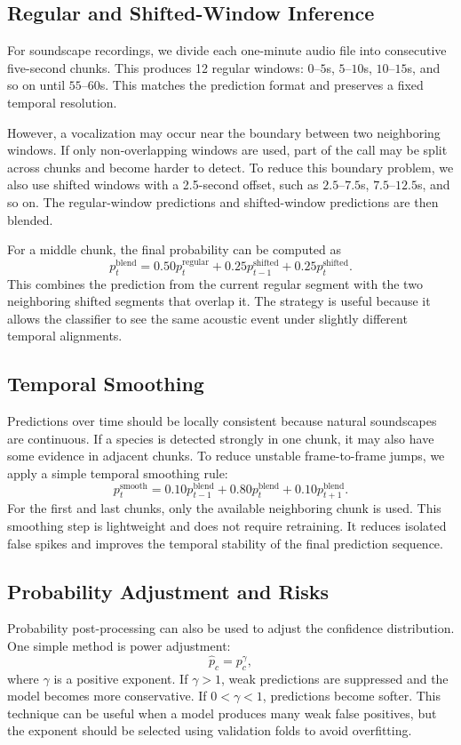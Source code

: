 \documentclass[a4paper,12pt]{article}
\begin{document}
\subsection{Regular and Shifted-Window Inference}
For soundscape recordings, we divide each one-minute audio file into consecutive five-second chunks. This produces 12 regular windows: $0$--$5$s, $5$--$10$s, $10$--$15$s, and so on until $55$--$60$s. This matches the prediction format and preserves a fixed temporal resolution.

However, a vocalization may occur near the boundary between two neighboring windows. If only non-overlapping windows are used, part of the call may be split across chunks and become harder to detect. To reduce this boundary problem, we also use shifted windows with a 2.5-second offset, such as $2.5$--$7.5$s, $7.5$--$12.5$s, and so on. The regular-window predictions and shifted-window predictions are then blended.

For a middle chunk, the final probability can be computed as
\[
p_t^{\mathrm{blend}}
=0.50p_t^{\mathrm{regular}}
+0.25p_{t-1}^{\mathrm{shifted}}
+0.25p_t^{\mathrm{shifted}}.
\]
This combines the prediction from the current regular segment with the two neighboring shifted segments that overlap it. The strategy is useful because it allows the classifier to see the same acoustic event under slightly different temporal alignments.

\subsection{Temporal Smoothing}
Predictions over time should be locally consistent because natural soundscapes are continuous. If a species is detected strongly in one chunk, it may also have some evidence in adjacent chunks. To reduce unstable frame-to-frame jumps, we apply a simple temporal smoothing rule:
\[
p_t^{\mathrm{smooth}}
=0.10p_{t-1}^{\mathrm{blend}}+0.80p_t^{\mathrm{blend}}+0.10p_{t+1}^{\mathrm{blend}}.
\]
For the first and last chunks, only the available neighboring chunk is used. This smoothing step is lightweight and does not require retraining. It reduces isolated false spikes and improves the temporal stability of the final prediction sequence.

\subsection{Probability Adjustment and Risks}
Probability post-processing can also be used to adjust the confidence distribution. One simple method is power adjustment:
\[
\hat{p}_c = p_c^\gamma,
\]
where $\gamma$ is a positive exponent. If $\gamma>1$, weak predictions are suppressed and the model becomes more conservative. If $0<\gamma<1$, predictions become softer. This technique can be useful when a model produces many weak false positives, but the exponent should be selected using validation folds to avoid overfitting.
\end{document}
